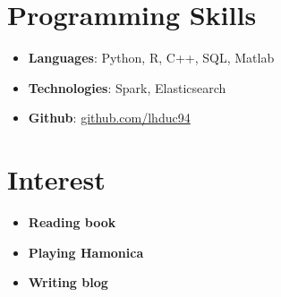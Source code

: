 \documentclass[letterpaper,11pt]{article}
\newcommand{\resumeSubHeadingListStart}{\begin{itemize}[leftmargin=*]}
\newcommand{\resumeSubHeadingListEnd}{\end{itemize}}
\begin{document}
%
\section{Programming Skills}
  \resumeSubHeadingListStart
    \item{
      \textbf{Languages}{: Python, R, C++, SQL, Matlab}
    }
  	\item{
	  \textbf{Technologies}{: Spark, Elasticsearch}
  	}
  	\item{
	  \textbf{Github}{: \href{github.com/lhduc94}{github.com/lhduc94}}
  	}
  \resumeSubHeadingListEnd

\section{Interest}
  \resumeSubHeadingListStart
  	\item{
  	  \textbf{Reading book}
  	}
  	\item{
	  \textbf{Playing Hamonica}
  	}
	\item{
	   \textbf{Writing blog}
	}
  \resumeSubHeadingListEnd

\end{document}

